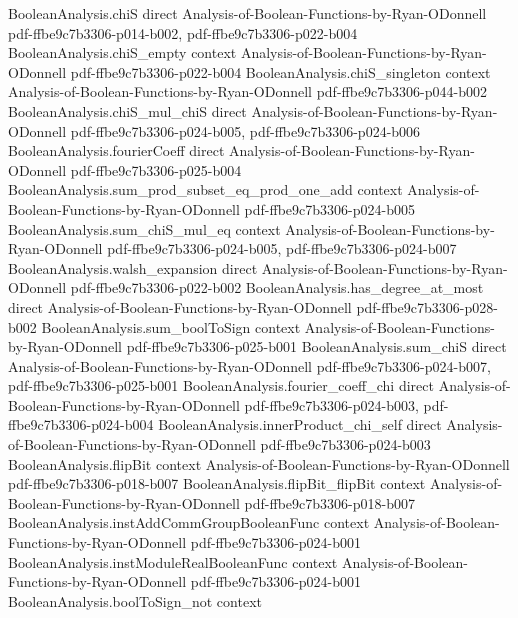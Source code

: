 \begin{theorem}
  {BooleanAnalysis.chiS}
  {direct}
  {Analysis-of-Boolean-Functions-by-Ryan-ODonnell}
  {pdf-ffbe9c7b3306-p014-b002,
    pdf-ffbe9c7b3306-p022-b004}
\proofstep
  {BooleanAnalysis.chiS_empty}
  {context}
  {Analysis-of-Boolean-Functions-by-Ryan-ODonnell}
  {pdf-ffbe9c7b3306-p022-b004}
\proofstep
  {BooleanAnalysis.chiS_singleton}
  {context}
  {Analysis-of-Boolean-Functions-by-Ryan-ODonnell}
  {pdf-ffbe9c7b3306-p044-b002}
\proofstep
  {BooleanAnalysis.chiS_mul_chiS}
  {direct}
  {Analysis-of-Boolean-Functions-by-Ryan-ODonnell}
  {pdf-ffbe9c7b3306-p024-b005,
    pdf-ffbe9c7b3306-p024-b006}
\proofstep
  {BooleanAnalysis.fourierCoeff}
  {direct}
  {Analysis-of-Boolean-Functions-by-Ryan-ODonnell}
  {pdf-ffbe9c7b3306-p025-b004}
\proofstep
  {BooleanAnalysis.sum_prod_subset_eq_prod_one_add}
  {context}
  {Analysis-of-Boolean-Functions-by-Ryan-ODonnell}
  {pdf-ffbe9c7b3306-p024-b005}
\proofstep
  {BooleanAnalysis.sum_chiS_mul_eq}
  {context}
  {Analysis-of-Boolean-Functions-by-Ryan-ODonnell}
  {pdf-ffbe9c7b3306-p024-b005,
    pdf-ffbe9c7b3306-p024-b007}
\proofstep
  {BooleanAnalysis.walsh_expansion}
  {direct}
  {Analysis-of-Boolean-Functions-by-Ryan-ODonnell}
  {pdf-ffbe9c7b3306-p022-b002}
\proofstep
  {BooleanAnalysis.has_degree_at_most}
  {direct}
  {Analysis-of-Boolean-Functions-by-Ryan-ODonnell}
  {pdf-ffbe9c7b3306-p028-b002}
\proofstep
  {BooleanAnalysis.sum_boolToSign}
  {context}
  {Analysis-of-Boolean-Functions-by-Ryan-ODonnell}
  {pdf-ffbe9c7b3306-p025-b001}
\proofstep
  {BooleanAnalysis.sum_chiS}
  {direct}
  {Analysis-of-Boolean-Functions-by-Ryan-ODonnell}
  {pdf-ffbe9c7b3306-p024-b007,
    pdf-ffbe9c7b3306-p025-b001}
\proofstep
  {BooleanAnalysis.fourier_coeff_chi}
  {direct}
  {Analysis-of-Boolean-Functions-by-Ryan-ODonnell}
  {pdf-ffbe9c7b3306-p024-b003,
    pdf-ffbe9c7b3306-p024-b004}
\proofstep
  {BooleanAnalysis.innerProduct_chi_self}
  {direct}
  {Analysis-of-Boolean-Functions-by-Ryan-ODonnell}
  {pdf-ffbe9c7b3306-p024-b003}
\proofstep
  {BooleanAnalysis.flipBit}
  {context}
  {Analysis-of-Boolean-Functions-by-Ryan-ODonnell}
  {pdf-ffbe9c7b3306-p018-b007}
\proofstep
  {BooleanAnalysis.flipBit_flipBit}
  {context}
  {Analysis-of-Boolean-Functions-by-Ryan-ODonnell}
  {pdf-ffbe9c7b3306-p018-b007}
\proofstep
  {BooleanAnalysis.instAddCommGroupBooleanFunc}
  {context}
  {Analysis-of-Boolean-Functions-by-Ryan-ODonnell}
  {pdf-ffbe9c7b3306-p024-b001}
\proofstep
  {BooleanAnalysis.instModuleRealBooleanFunc}
  {context}
  {Analysis-of-Boolean-Functions-by-Ryan-ODonnell}
  {pdf-ffbe9c7b3306-p024-b001}
\proofstep
  {BooleanAnalysis.boolToSign_not}
  {context}

\end{theorem}
